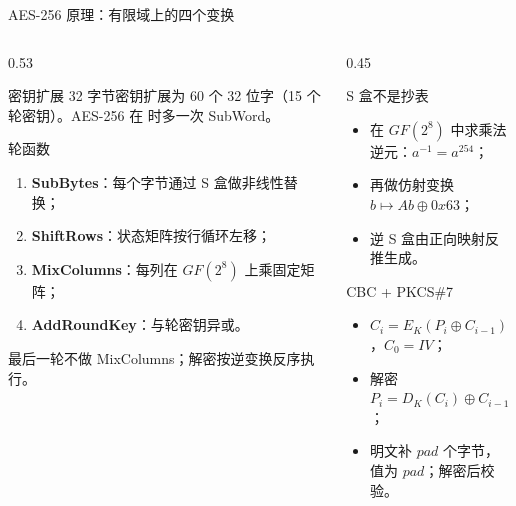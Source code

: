 \documentclass[aspectratio=169,10pt]{beamer}
\newcommand{\key}[1]{\textcolor{MFAccent}{\textbf{#1}}}
\newcommand{\code}[1]{\texttt{\small\detokenize{#1}}}
\begin{document}
\begin{frame}{AES-256 原理：有限域上的四个变换}
  \begin{columns}[T]
    \begin{column}{0.53\textwidth}
      \begin{block}{密钥扩展}
        \small
        32 字节密钥扩展为 60 个 32 位字（15 个轮密钥）。AES-256 在 \code{i \% 8 == 4} 时多一次 SubWord。
      \end{block}
      \begin{block}{轮函数}
        \small
        \begin{enumerate}
          \item \key{SubBytes}：每个字节通过 S 盒做非线性替换；
          \item \key{ShiftRows}：状态矩阵按行循环左移；
          \item \key{MixColumns}：每列在 $GF(2^8)$ 上乘固定矩阵；
          \item \key{AddRoundKey}：与轮密钥异或。
        \end{enumerate}
        最后一轮不做 MixColumns；解密按逆变换反序执行。
      \end{block}
    \end{column}
    \begin{column}{0.45\textwidth}
      \begin{block}{S 盒不是抄表}
        \small
        \begin{itemize}
          \item 在 $GF(2^8)$ 中求乘法逆元：$a^{-1}=a^{254}$；
          \item 再做仿射变换 $b \mapsto A b \oplus 0x63$；
          \item 逆 S 盒由正向映射反推生成。
        \end{itemize}
      \end{block}
      \begin{block}{CBC + PKCS\#7}
        \small
        \begin{itemize}
          \item $C_i = E_K(P_i \oplus C_{i-1})$，$C_0=IV$；
          \item 解密 $P_i = D_K(C_i) \oplus C_{i-1}$；
          \item 明文补 $pad$ 个字节，值为 $pad$；解密后校验。
        \end{itemize}
      \end{block}
    \end{column}
  \end{columns}
\end{frame}
\end{document}
